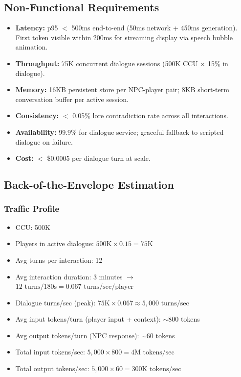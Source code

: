 \subsection*{Non-Functional Requirements}
\begin{itemize}
  \item \textbf{Latency:} p95 $<$ 500ms end-to-end (50ms network + 450ms generation). First token visible within 200ms for streaming display via speech bubble animation.
  \item \textbf{Throughput:} 75K concurrent dialogue sessions (500K CCU $\times$ 15\% in dialogue).
  \item \textbf{Memory:} 16KB persistent store per NPC-player pair; 8KB short-term conversation buffer per active session.
  \item \textbf{Consistency:} $<$ 0.05\% lore contradiction rate across all interactions.
  \item \textbf{Availability:} 99.9\% for dialogue service; graceful fallback to scripted dialogue on failure.
  \item \textbf{Cost:} $<$ \$0.0005 per dialogue turn at scale.
\end{itemize}

\subsection*{Back-of-the-Envelope Estimation}

\subsubsection*{Traffic Profile}
\begin{itemize}
  \item CCU: 500K
  \item Players in active dialogue: $500\text{K} \times 0.15 = 75\text{K}$
  \item Avg turns per interaction: 12
  \item Avg interaction duration: 3 minutes $\rightarrow$ $12 \text{ turns} / 180\text{s} = 0.067 \text{ turns/sec/player}$
  \item Dialogue turns/sec (peak): $75\text{K} \times 0.067 \approx 5{,}000 \text{ turns/sec}$
  \item Avg input tokens/turn (player input + context): $\sim$800 tokens
  \item Avg output tokens/turn (NPC response): $\sim$60 tokens
  \item Total input tokens/sec: $5{,}000 \times 800 = 4\text{M tokens/sec}$
  \item Total output tokens/sec: $5{,}000 \times 60 = 300\text{K tokens/sec}$
\end{itemize}

